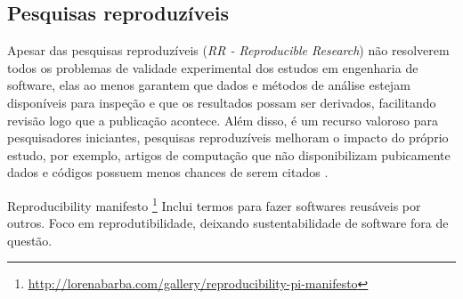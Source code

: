 \subsection{Pesquisas reproduzíveis}

Apesar das pesquisas reproduzíveis ({\it RR - Reproducible Research}) não
resolverem todos os problemas de validade experimental dos estudos em
engenharia de software, elas ao menos garantem que dados e métodos de análise
estejam disponíveis para inspeção e que os resultados possam ser derivados,
facilitando revisão logo que a publicação acontece. Além disso, é um recurso
valoroso para pesquisadores iniciantes, pesquisas reproduzíveis melhoram o
impacto do próprio estudo, por exemplo, artigos de computação que não
disponibilizam pubicamente dados e códigos possuem menos chances de serem
citados \cite{madeyski_would_2017}.

Reproducibility manifesto \cite{Barba2012}\footnote{\url{http://lorenabarba.com/gallery/reproducibility-pi-manifesto}}
Inclui termos para fazer softwares reusáveis por outros. Foco em
reprodutibilidade, deixando sustentabilidade de software fora de questão.




